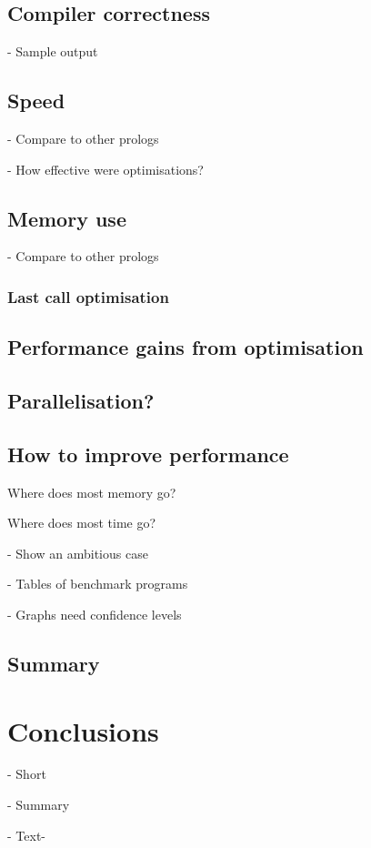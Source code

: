 \documentclass[12pt,a4paper]{report}
\begin{document}
\section{Compiler correctness}

- Sample output

\section{Speed}

- Compare to other prologs 

- How effective were optimisations?

\section{Memory use}

- Compare to other prologs

\subsection{Last call optimisation}

\section{Performance gains from optimisation}

\section{Parallelisation?} 


\section{How to improve performance}

Where does most memory go?

Where does most time go?

\hrulefill 
    
- Show an ambitious case

- Tables of benchmark programs

- Graphs need confidence levels 


\section{Summary}

\chapter{Conclusions}

- Short 

- Summary

- Text-






% 


\end{document}
